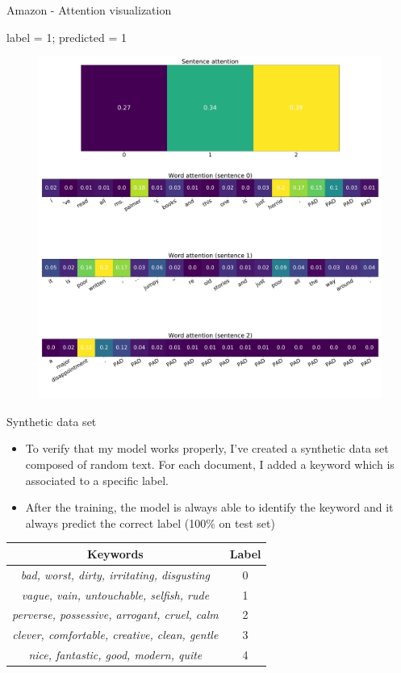\documentclass[10pt]{beamer}
\begin{document}
\begin{frame}{Amazon - Attention visualization}

label = 1; predicted = 1

\begin{figure}
\centering
\includegraphics[scale=0.15]{img/amazon-han-visual}
\end{figure}

\end{frame}


\begin{frame}{Synthetic data set}

\begin{itemize}
\item
To verify that my model works properly, I've created a synthetic data set composed of random text. For each document, I added a keyword which is associated to a specific label.
\item
After the training, the model is always able to identify the keyword and it always predict the correct label (100\% on test set)
\end{itemize}

\begin{table}[]
\begin{tabular}{|c|c|}
\hline
\textbf{Keywords} & \textbf{Label} \\
\hline
\textit{bad, worst, dirty, irritating, disgusting} & 0 \\
\hline
\textit{vague, vain, untouchable, selfish, rude} & 1 \\
\hline
\textit{perverse, possessive, arrogant, cruel, calm} & 2 \\
\hline
\textit{clever, comfortable, creative, clean, gentle} & 3 \\
\hline
\textit{nice, fantastic, good, modern, quite} & 4 \\
\hline
\end{tabular}
\end{table}

\end{frame}
\end{document}
